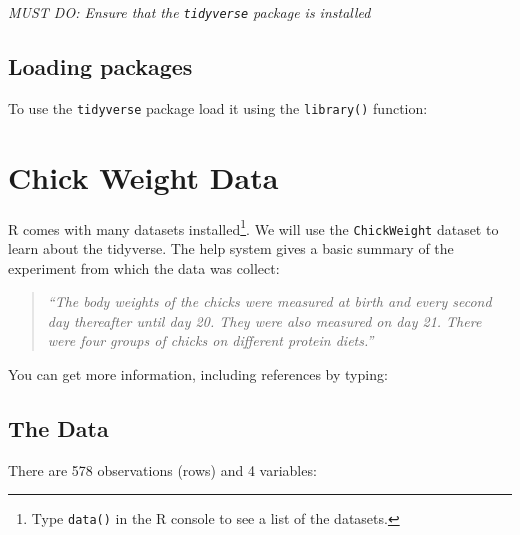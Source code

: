 \documentclass[letterpaperpaper,9pt,twocolumn,twoside,printwatermark=false]{pinp}
\begin{document}
\emph{MUST DO: Ensure that the \texttt{tidyverse} package is installed}

\begin{Shaded}
\begin{Highlighting}[]
\NormalTok{(}\NormalTok{)}
\end{Highlighting}
\end{Shaded}

\hypertarget{loading-packages}{%
\subsection{Loading packages}\label{loading-packages}}

To use the \texttt{tidyverse} package load it using the
\texttt{library()} function:

\hypertarget{chick-weight-data}{%
\section{Chick Weight Data}\label{chick-weight-data}}

R comes with many datasets installed\footnote{Type \texttt{data()} in
  the R console to see a list of the datasets.}. We will use the
\texttt{ChickWeight} dataset to learn about the tidyverse. The help
system gives a basic summary of the experiment from which the data was
collect:

\begin{quote}
\emph{``The body weights of the chicks were measured at birth and every
second day thereafter until day 20. They were also measured on day 21.
There were four groups of chicks on different protein diets.''}
\end{quote}

You can get more information, including references by typing:

\begin{Shaded}
\begin{Highlighting}[]
\NormalTok{(}\NormalTok{)}
\end{Highlighting}
\end{Shaded}

\hypertarget{the-data}{%
\subsection{The Data}\label{the-data}}

There are 578 observations (rows) and 4 variables:
\end{document}
